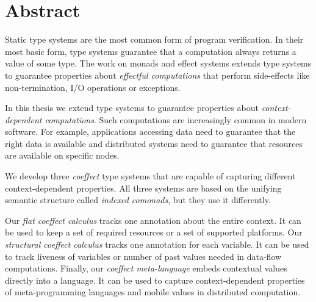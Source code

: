 

\begingroup
\let\clearpage\relax
\let\cleardoublepage\relax
\let\cleardoublepage\relax

\chapter*{Abstract} %

Static type systems are the most common form of program verification. In their most basic form, type
systems guarantee that a computation always returns a value of some type. The work on monads
and effect systems extends type systems to guarantee properties about \emph{effectful 
computations} that perform side-effects like non-termination, I/O operations or exceptions.

In this thesis we extend type systems to guarantee properties about \emph{context-dependent
computations}. Such computations are increasingly common in modern software. For example, applications
accessing data need to guarantee that the right data is available and distributed systems need to 
guarantee that resources are available on specific nodes.

We develop three \emph{coeffect} type systems that are capable of capturing different context-dependent
properties. All three systems are based on the unifying semantic structure called \emph{indexed
comonads}, but they use it differently. 

Our \emph{flat coeffect calculus} tracks one annotation about the entire context. It can be used to
keep a set of required resources or a set of supported platforms. Our \emph{structural coeffect 
calculus} tracks one annotation for each variable. It can be used to track liveness of variables
or number of past values needed in data-flow computations. Finally, our \emph{coeffect meta-language}
embeds contextual values directly into a language. It can be used to capture context-dependent 
properties of meta-programming languages and mobile values in distributed computation.

\endgroup			

\vfill